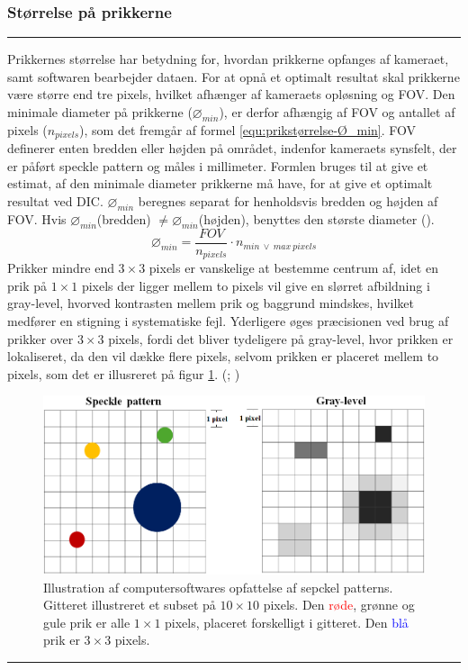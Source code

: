 \subsubsection{Størrelse på prikkerne} \plainbreak{-0.4}
Prikkernes størrelse har betydning for, hvordan prikkerne opfanges af kameraet, samt softwaren bearbejder dataen. For at opnå et optimalt resultat skal prikkerne være større end tre pixels, hvilket afhænger af kameraets opløsning og FOV. Den minimale diameter på prikkerne ($\diameter_{min}$), er derfor afhængig af FOV og antallet af pixels ($n_{pixels}$), som det fremgår af formel \ref{equ:prikstørrelse-Ø_min}. FOV definerer enten bredden eller højden på området, indenfor kameraets synsfelt, der er påført speckle pattern og måles i millimeter. Formlen bruges til at give et estimat, af den minimale diameter prikkerne må have, for at give et optimalt resultat ved DIC. $\diameter_{min}$ beregnes separat for henholdsvis bredden og højden af FOV. Hvis $\diameter_{min}$(bredden) $\neq \diameter_{min}$(højden), benyttes den største diameter (\cite{Reu2014AllAliasing}).
 \begin{equation} \label{equ:prikstørrelse-Ø_min}
     \diameter_{min} = \frac{FOV}{n_{pixels}} \cdot n_{min \ \vee \  max \ pixels} 
 \end{equation}
Prikker mindre end $3\times3$ pixels er vanskelige at bestemme centrum af, idet en prik på $1\times1$ pixels der ligger mellem to pixels vil give en slørret afbildning i gray-level, hvorved kontrasten mellem prik og baggrund mindskes, hvilket medfører en stigning i systematiske fejl. Yderligere øges præcisionen ved brug af prikker over $3\times3$ pixels, fordi det bliver tydeligere på gray-level, hvor prikken er lokaliseret, da den vil dække flere pixels, selvom prikken er placeret mellem to pixels, som det er illusreret på figur \ref{fig:gray-level}. (\cite{Reu2014AllAliasing}; \cite{Cui2024EffectError})

\begin{figure}[H]
    \centering
    \includegraphics[width=0.8\linewidth]{Sections/2 Problemanalyse/Media/gray-level.png}
    \caption{Illustration af computersoftwares opfattelse af sepckel patterns. Gitteret illustreret et subset på $10\times10$ pixels. Den \textcolor{red}{røde}, \textcolor{greenB}{grønne} og \textcolor{gulny}{gule} prik er alle $1\times1$ pixels, placeret forskelligt i gitteret. Den \textcolor{blue}{blå} prik er $3\times3$ pixels.}
    \label{fig:gray-level}
\end{figure} \plainbreak{-.5}

